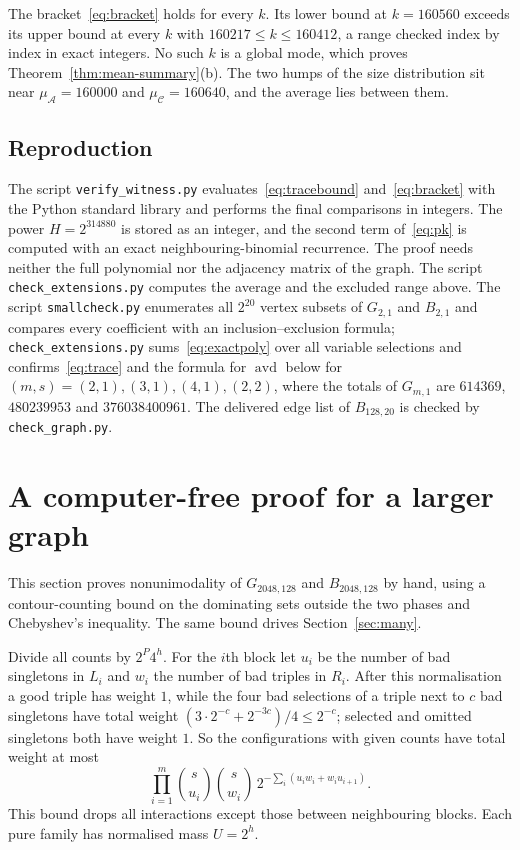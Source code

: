 \documentclass[11pt,a4paper]{article}
\theoremstyle{definition}
\theoremstyle{remark}
\newcommand{\avd}{\operatorname{avd}}
\newcommand{\cA}{\mathcal A}
\newcommand{\cC}{\mathcal C}
\begin{document}
The bracket~\eqref{eq:bracket} holds for every $k$. Its lower bound at $k=160560$ exceeds its upper bound at every $k$ with $160217\le k\le 160412$, a range checked index by index in exact integers. No such $k$ is a global mode, which proves Theorem~\ref{thm:mean-summary}(b). The two humps of the size distribution sit near $\mu_\cA=160000$ and $\mu_\cC=160640$, and the average lies between them.

\subsection{Reproduction}
The script \texttt{verify\_witness.py} evaluates~\eqref{eq:tracebound} and~\eqref{eq:bracket} with the Python standard library and performs the final comparisons in integers. The power $H=2^{314880}$ is stored as an integer, and the second term of~\eqref{eq:pk} is computed with an exact neighbouring-binomial recurrence. The proof needs neither the full polynomial nor the adjacency matrix of the graph. The script \texttt{check\_extensions.py} computes the average and the excluded range above. The script \texttt{smallcheck.py} enumerates all $2^{20}$ vertex subsets of $G_{2,1}$ and $B_{2,1}$ and compares every coefficient with an inclusion--exclusion formula; \texttt{check\_extensions.py} sums~\eqref{eq:exactpoly} over all variable selections and confirms~\eqref{eq:trace} and the formula for $\avd$ below for $(m,s)=(2,1),(3,1),(4,1),(2,2)$, where the totals of $G_{m,1}$ are $614369$, $480239953$ and $376038400961$. The delivered edge list of $B_{128,20}$ is checked by \texttt{check\_graph.py}.

\section{A computer-free proof for a larger graph}\label{sec:elementary}
This section proves nonunimodality of $G_{2048,128}$ and $B_{2048,128}$ by hand, using a contour-counting bound on the dominating sets outside the two phases and Chebyshev's inequality. The same bound drives Section~\ref{sec:many}.

Divide all counts by $2^P4^h$. For the $i$th block let $u_i$ be the number of bad singletons in $L_i$ and $w_i$ the number of bad triples in $R_i$. After this normalisation a good triple has weight $1$, while the four bad selections of a triple next to $c$ bad singletons have total weight $(3\cdot2^{-c}+2^{-3c})/4\le2^{-c}$; selected and omitted singletons both have weight $1$. So the configurations with given counts have total weight at most
\begin{equation}\label{eq:soft}
\prod_{i=1}^{m}\binom{s}{u_i}\binom{s}{w_i}
\,2^{-\sum_i(u_i w_i+w_i u_{i+1})}.
\end{equation}
This bound drops all interactions except those between neighbouring blocks. Each pure family has normalised mass $U=2^h$.
\end{document}
